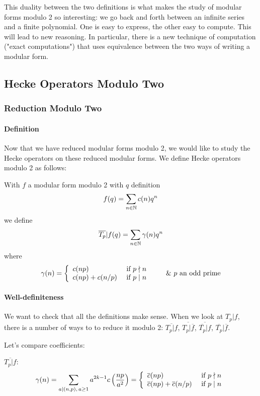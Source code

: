 This duality between the two definitions is what makes the study of modular forms modulo 2 so interesting:
we go back and forth between an infinite series and a finite polynomial.
One is easy to express, the other easy to compute.
This will lead to new reasoning.
In particular, there is a new technique of computation ("exact computations") that uses equivalence between the two ways of writing a modular form.



\subsection{Hecke Operators Modulo Two}
\subsubsection{Reduction Modulo Two}
\paragraph{Definition}
\label{DefHeckeOperatorsMod2}
Now that we have reduced modular forms modulo 2, we would like to study the Hecke operators on these reduced modular forms. We define Hecke operators modulo 2 as follows:

With $f$ a modular form modulo 2 with $q$ definition
$$
f(q) = \sum_{n \in \mathbb{N}} c(n)q^n
$$
we define
$$
\overline{T_p}|f(q) = \sum_{n \in \mathbb{N}} \gamma(n)q^n
$$
where
$$
\gamma(n) = 
\left\lbrace
\begin{array}{l l}
  c(np)        & \text{ if } p \nmid n \\
  c(np)+c(n/p) & \text{ if } p \mid  n
\end{array}
\right. 
\qquad \&\ p \text{ an odd prime}
$$

\paragraph{Well-definiteness}
We want to check that all the definitions make sense. When we look at $T_p|f$, there is a number of ways to to reduce it modulo 2: $\overline{T_p|f}$, $\overline{T_p|\overline{f}}$, $\overline{\overline{T_p}|f}$, $\overline{T_p}|\overline{f}$.

Let's compare coefficients:

$\overline{T_p|f}$:
$$
\gamma(n) 
= \sum_{a \mid (n,p),\, a \geq 1} a^{2k-1} c\left( \frac{np}{a^2} \right)
= \left\lbrace
\begin{array}{l l}
  \overline{c}(np)                   & \text{ if } p \nmid n \\
  \overline{c}(np)+\overline{c}(n/p) & \text{ if } p \mid  n
\end{array}
\right.
$$

